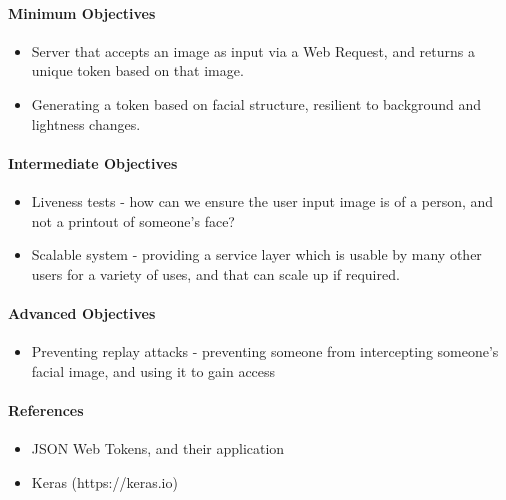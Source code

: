 \documentclass{article}
\begin{document}
    \paragraph{Minimum Objectives}
        \begin{itemize}
            \item Server that accepts an image as input via a Web Request, and returns a unique token based on that image.
            \item Generating a token based on facial structure, resilient to background and lightness changes.
        \end{itemize}
    \paragraph{Intermediate Objectives}
        \begin{itemize}
            \item Liveness tests - how can we ensure the user input image is of a person, and not a printout of someone's face?
            \item Scalable system - providing a service layer which is usable by many other users for a variety of uses, and that can scale up if required.
        \end{itemize}
    \paragraph{Advanced Objectives}
        \begin{itemize}
            \item Preventing replay attacks - preventing someone from intercepting someone's facial image, and using it to gain access
        \end{itemize}
    \paragraph{References}
        \begin{itemize}
            \item JSON Web Tokens, and their application
            \item Keras (https://keras.io)
        \end{itemize}
\end{document}
